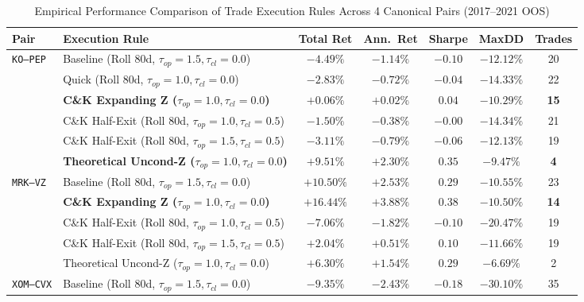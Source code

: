 \documentclass[11pt, a4paper]{article}
\begin{document}
\begin{table}[h!]
\centering
\footnotesize
\setlength{\tabcolsep}{2.5pt}
\caption{Empirical Performance Comparison of Trade Execution Rules Across 4 Canonical Pairs (2017--2021 OOS)}
\label{tab:trade_rules_comparison}
\begin{tabular}{llccccc}
\toprule
\textbf{Pair} & \textbf{Execution Rule} & \textbf{Total Ret} & \textbf{Ann.\ Ret} & \textbf{Sharpe} & \textbf{MaxDD} & \textbf{Trades} \\
\midrule
\texttt{KO--PEP} & Baseline (Roll 80d, $\tau_{op}=1.5, \tau_{cl}=0.0$) & $-4.49\%$ & $-1.14\%$ & $-0.10$ & $-12.12\%$ & 20 \\
                 & Quick (Roll 80d, $\tau_{op}=1.0, \tau_{cl}=0.0$)    & $-2.83\%$ & $-0.72\%$ & $-0.04$ & $-14.33\%$ & 22 \\
                 & \textbf{C\&K Expanding Z ($\tau_{op}=1.0, \tau_{cl}=0.0$)}  & $\mathbf{+0.06\%}$ & $\mathbf{+0.02\%}$ & $\mathbf{0.04}$ & $\mathbf{-10.29\%}$ & \textbf{15} \\
                 & C\&K Half-Exit (Roll 80d, $\tau_{op}=1.0, \tau_{cl}=0.5$)   & $-1.50\%$ & $-0.38\%$ & $-0.00$ & $-14.34\%$ & 21 \\
                 & C\&K Half-Exit (Roll 80d, $\tau_{op}=1.5, \tau_{cl}=0.5$)   & $-3.11\%$ & $-0.79\%$ & $-0.06$ & $-12.13\%$ & 19 \\
                 & \textbf{Theoretical Uncond-Z ($\tau_{op}=1.0, \tau_{cl}=0.0$)} & $\mathbf{+9.51\%}$ & $\mathbf{+2.30\%}$ & $\mathbf{0.35}$ & $\mathbf{-9.47\%}$ & \textbf{4} \\
\midrule
\texttt{MRK--VZ} & Baseline (Roll 80d, $\tau_{op}=1.5, \tau_{cl}=0.0$) & $+10.50\%$ & $+2.53\%$ & $0.29$ & $-10.55\%$ & 23 \\
                 & \textbf{C\&K Expanding Z ($\tau_{op}=1.0, \tau_{cl}=0.0$)}  & $\mathbf{+16.44\%}$ & $\mathbf{+3.88\%}$ & $\mathbf{0.38}$ & $\mathbf{-10.50\%}$ & \textbf{14} \\
                 & C\&K Half-Exit (Roll 80d, $\tau_{op}=1.0, \tau_{cl}=0.5$)   & $-7.06\%$ & $-1.82\%$ & $-0.10$ & $-20.47\%$ & 19 \\
                 & C\&K Half-Exit (Roll 80d, $\tau_{op}=1.5, \tau_{cl}=0.5$)   & $+2.04\%$ & $+0.51\%$ & $0.10$ & $-11.66\%$ & 19 \\
                 & Theoretical Uncond-Z ($\tau_{op}=1.0, \tau_{cl}=0.0$)       & $+6.30\%$ & $+1.54\%$ & $0.29$ & $-6.69\%$ & 2 \\
\midrule
\texttt{XOM--CVX}& Baseline (Roll 80d, $\tau_{op}=1.5, \tau_{cl}=0.0$) & $-9.35\%$ & $-2.43\%$ & $-0.18$ & $-30.10\%$ & 35 \\

\end{tabular}
\end{table}
\end{document}
